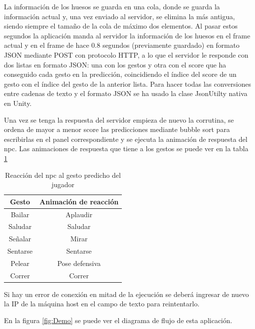 La información de los huesos se guarda en una cola, donde se guarda la información actual y, una vez enviado al servidor, se elimina la más antigua, siendo siempre el tamaño de la cola de máximo dos elementos.
Al pasar estos segundos la aplicación manda al servidor la información de los huesos en el frame actual y en el frame de hace 0.8 segundos (previamente guardado) en formato JSON mediante POST con protocolo HTTP, a lo que el servidor le responde con dos listas en formato JSON: una con los gestos y otra con el score que ha conseguido cada gesto en la predicción, coincidiendo el índice del score de un gesto con el índice del gesto de la anterior lista.
Para hacer todas las conversiones entre cadenas de texto y el formato JSON se ha usado la clase JsonUtilty nativa en Unity.

Una vez se tenga la respuesta del servidor empieza de nuevo la corrutina, se ordena de mayor a menor score las predicciones mediante bubble sort para escribirlas en el panel correspondiente y se ejecuta la animación de respuesta del \gls{npc}.
Las animaciones de respuesta que tiene a los gestos se puede ver en la tabla \ref{tab:gestos-reaccion}

\begin{table}[H]
    \begin{center}
        \begin{tabular}{| c | c |}
            \hline
            Gesto    & Animación de reacción \\ \hline
            Bailar   & Aplaudir              \\
            Saludar  & Saludar               \\
            Señalar  & Mirar                 \\
            Sentarse & Sentarse              \\
            Pelear   & Pose defensiva        \\
            Correr   & Correr                \\ \hline
        \end{tabular}
        \caption{Reacción del \gls{npc} al gesto predicho del jugador}
        \label{tab:gestos-reaccion}
    \end{center}
\end{table}

Si hay un error de conexión en mitad de la ejecución se deberá ingresar de nuevo la IP de la máquina host en el campo de texto para reintentarlo.

En la figura \ref{fig:Demo} se puede ver el diagrama de flujo de esta aplicación.

